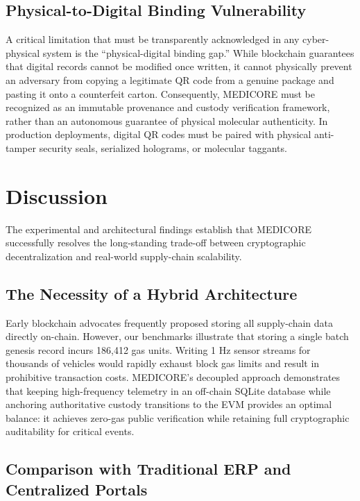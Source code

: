 \documentclass[pdflatex,sn-mathphys-num]{sn-jnl}
\theoremstyle{thmstyleone}
\theoremstyle{thmstyletwo}
\theoremstyle{thmstylethree}
\begin{document}
\subsection{Physical-to-Digital Binding Vulnerability}

A critical limitation that must be transparently acknowledged in any cyber-physical system is the ``physical-digital binding gap.'' While blockchain guarantees that digital records cannot be modified once written, it cannot physically prevent an adversary from copying a legitimate QR code from a genuine package and pasting it onto a counterfeit carton. Consequently, MEDICORE must be recognized as an immutable provenance and custody verification framework, rather than an autonomous guarantee of physical molecular authenticity. In production deployments, digital QR codes must be paired with physical anti-tamper security seals, serialized holograms, or molecular taggants.


\section{Discussion}\label{sec:discussion}

The experimental and architectural findings establish that MEDICORE successfully resolves the long-standing trade-off between cryptographic decentralization and real-world supply-chain scalability.

\subsection{The Necessity of a Hybrid Architecture}

Early blockchain advocates frequently proposed storing all supply-chain data directly on-chain. However, our benchmarks illustrate that storing a single batch genesis record incurs 186,412 gas units. Writing 1 Hz sensor streams for thousands of vehicles would rapidly exhaust block gas limits and result in prohibitive transaction costs. MEDICORE's decoupled approach demonstrates that keeping high-frequency telemetry in an off-chain SQLite database while anchoring authoritative custody transitions to the EVM provides an optimal balance: it achieves zero-gas public verification while retaining full cryptographic auditability for critical events.

\subsection{Comparison with Traditional ERP and Centralized Portals}
\end{document}
